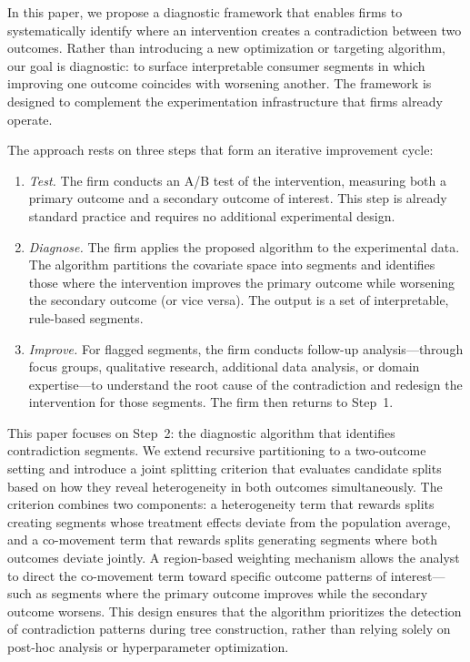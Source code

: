 \documentclass[11pt,letterpaper,english]{article}
\theoremstyle{definition}
\theoremstyle{definition}
\begin{document}
\begin{bibunit}
In this paper, we propose a diagnostic framework that enables firms to systematically identify where an intervention creates a contradiction between two outcomes. Rather than introducing a new optimization or targeting algorithm, our goal is diagnostic: to surface interpretable consumer segments in which improving one outcome coincides with worsening another. The framework is designed to complement the experimentation infrastructure that firms already operate.

The approach rests on three steps that form an iterative improvement cycle:
\begin{enumerate}[leftmargin=2em]
    \item \emph{Test.} The firm conducts an A/B test of the intervention, measuring both a primary outcome and a secondary outcome of interest. This step is already standard practice and requires no additional experimental design.
    \item \emph{Diagnose.} The firm applies the proposed algorithm to the experimental data. The algorithm partitions the covariate space into segments and identifies those where the intervention improves the primary outcome while worsening the secondary outcome (or vice versa). The output is a set of interpretable, rule-based segments.
    \item \emph{Improve.} For flagged segments, the firm conducts follow-up analysis---through focus groups, qualitative research, additional data analysis, or domain expertise---to understand the root cause of the contradiction and redesign the intervention for those segments. The firm then returns to Step~1.
\end{enumerate}

This paper focuses on Step~2: the diagnostic algorithm that identifies contradiction segments. We extend recursive partitioning to a two-outcome setting and introduce a joint splitting criterion that evaluates candidate splits based on how they reveal heterogeneity in both outcomes simultaneously. The criterion combines two components: a heterogeneity term that rewards splits creating segments whose treatment effects deviate from the population average, and a co-movement term that rewards splits generating segments where both outcomes deviate jointly. A region-based weighting mechanism allows the analyst to direct the co-movement term toward specific outcome patterns of interest---such as segments where the primary outcome improves while the secondary outcome worsens. This design ensures that the algorithm prioritizes the detection of contradiction patterns during tree construction, rather than relying solely on post-hoc analysis or hyperparameter optimization.


\end{bibunit}
\end{document}

